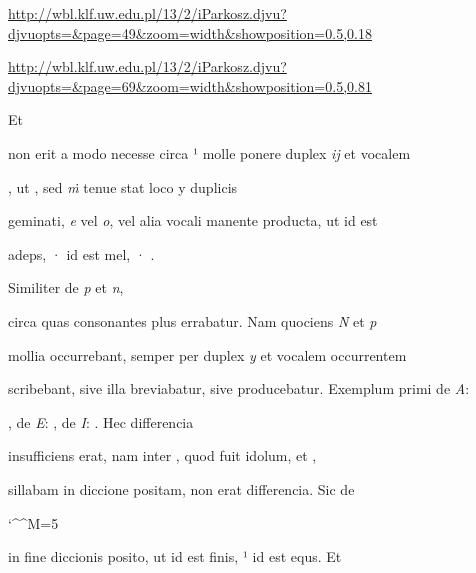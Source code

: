 
\newParkoszpage


{
\url{http://wbl.klf.uw.edu.pl/13/2/iParkosz.djvu?djvuopts=&page=49&zoom=width&showposition=0.5,0.18}

\url{http://wbl.klf.uw.edu.pl/13/2/iParkosz.djvu?djvuopts=&page=69&zoom=width&showposition=0.5,0.81}
}


\fullpreviouslines


{
\color{blue}
Et

}


\fulllines
{}
non erit a modo necesse circa ¹ molle ponere duplex \textit{ij} et vocalem 

, ut  , sed \textit{ṁ} tenue stat loco y duplicis

geminati, \textit{e} vel \textit{o}, vel alia vocali manente producta, ut  id est

\splitlines
adeps, ·  id est mel, · .

\indentK Similiter de \textit{p} et \textit{n},

\fulllines
circa quas consonantes plus errabatur. Nam quociens \textit{N} et \textit{p}

mollia occurrebant, semper per duplex \textit{y} et vocalem occurrentem

scribebant, sive illa breviabatur, sive producebatur. Exemplum primi de \textit{A}:

, de \textit{E}: , de \textit{I}: . Hec differencia

insufficiens erat, nam inter , quod fuit idolum, et ,

sillabam in diccione  positam, non erat differencia. Sic de

\catcode `\^^M=5


\obeylines

 in fine diccionis posito, ut  id est finis, ¹ id est equs. Et

